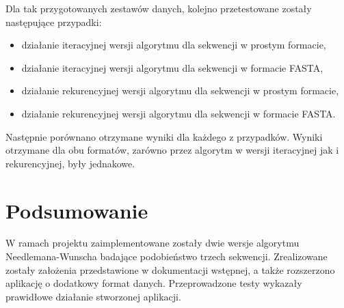 \documentclass[12pt, a4paper]{article}
\begin{document}
	Dla tak przygotowanych zestawów danych, kolejno przetestowane zostały następujące przypadki:
	\begin{itemize}
		\item działanie iteracyjnej wersji algorytmu dla sekwencji w prostym formacie,
		\item działanie iteracyjnej wersji algorytmu dla sekwencji w formacie FASTA,
		\item działanie rekurencyjnej wersji algorytmu dla sekwencji w prostym formacie,
		\item działanie rekurencyjnej wersji algorytmu dla sekwencji w formacie FASTA.
	\end{itemize}
	Następnie porównano otrzymane wyniki dla każdego z przypadków. Wyniki otrzymane dla obu formatów, zarówno przez algorytm w wersji iteracyjnej jak i rekurencyjnej, były jednakowe.

\section{Podsumowanie}
W ramach projektu zaimplementowane zostały dwie wersje algorytmu Needlemana-Wunscha badające podobieństwo trzech sekwencji. Zrealizowane zostały założenia przedstawione w dokumentacji wstępnej, a także rozszerzono aplikację o dodatkowy format danych. Przeprowadzone testy wykazały prawidłowe działanie stworzonej aplikacji. 

\nocite{*}


\end{document}
